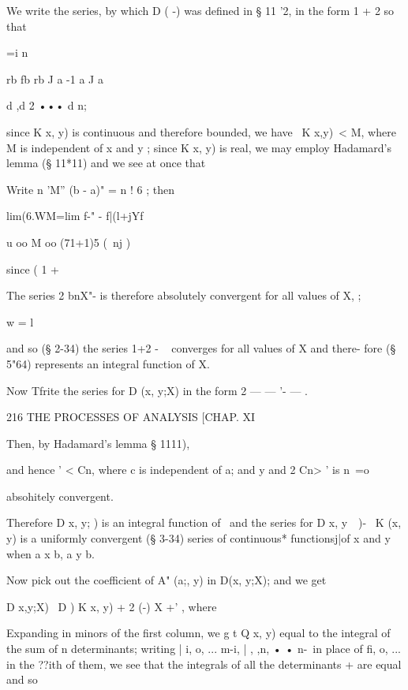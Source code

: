 We write the series, by which D ( -) was defined in § 11 '2, in the
form 1 + 2 so that



 =i n\



rb fb rb J a -1 a J a






d ,d 2 ••• d n;



since K x, y) is continuous and therefore bounded, we have \ K x,y)\ <
M, where M is independent of x and y ; since K x, y) is real, we may
employ Hadamard's lemma (§ 11*11) and we see at once that

Write n 'M'' (b - a)" = n ! 6 ; then

lim(6.WM=lim f-" - f|(l+jYf

u oo M oo (71+1)5 (\ nj )



since ( 1 +



The series 2 bnX"- is therefore absolutely convergent for all values
of X, ;

w = l

and so (§ 2-34) the series 1+2 - ~ converges for all values of X and
there- fore (§ 5"64) represents an integral function of X.

Now Tfrite the series for D (x, y;X) in the form 2 — — '- — .



216 THE PROCESSES OF ANALYSIS [CHAP. XI

Then, by Hadamard's lemma § 1111),

and hence ' < Cn, where c is independent of a; and y and 2 Cn> ' is n\
=o

absohitely convergent.

Therefore D x, y; ) is an integral function of \ and the series for D
x, y\ \ )- \ K (x, y) is a uniformly convergent (§ 3-34) series of
continuous* functionsj|of x and y when a x b, a y b.

Now pick out the coefficient of A" (a;, y) in D(x, y;X); and we get

D x,y;X) \ D ) K x, y) + 2 (-) X +' , where

Expanding in minors of the first column, we g t Q x, y) equal to the
integral of the sum of n determinants; writing | i, o, ... m-i, | ,
,n, • • n-\ in place of fi, o, ... in the ??ith of them, we see that
the integrals of all the determinants + are equal and so

